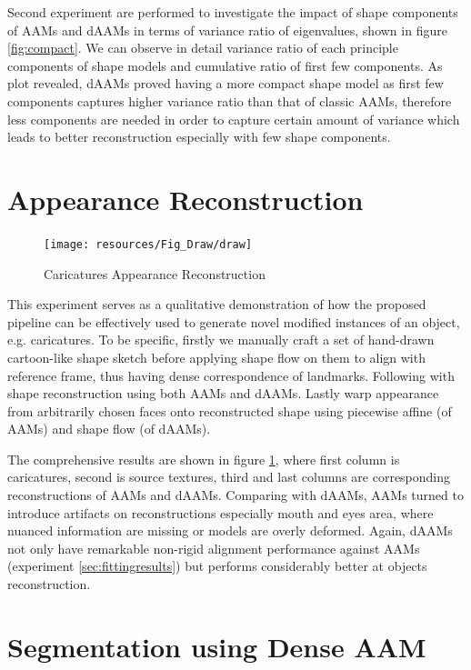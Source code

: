 Second experiment are performed to investigate the impact of shape components of AAMs and dAAMs in terms of variance ratio of eigenvalues, shown in figure \ref{fig:compact}. We can observe in detail variance ratio of each principle components of shape models and cumulative ratio of first few components. As plot revealed, dAAMs proved having a more compact shape model as first few components captures higher variance ratio than that of classic AAMs, therefore less components are needed in order to capture certain amount of variance which leads to better reconstruction especially with few shape components.


\section{Appearance Reconstruction}
\label{sec:reconstruct}

\begin{figure}[h!]
    \centering
    \texttt{[image: resources/Fig\_Draw/draw]}
    \caption{Caricatures Appearance Reconstruction}
    \label{fig:draw}
\end{figure}

This experiment serves as a qualitative demonstration of how the proposed pipeline can be effectively used to generate novel modified instances of an object, e.g. caricatures. To be specific, firstly we manually craft a set of hand-drawn cartoon-like shape sketch before applying shape flow on them to align with reference frame, thus having dense correspondence of landmarks. Following with shape reconstruction using both AAMs and dAAMs. Lastly warp appearance from arbitrarily chosen faces onto reconstructed shape using piecewise affine (of AAMs) and shape flow (of dAAMs). 

The comprehensive results are shown in figure \ref{fig:draw}, where first column is caricatures, second is source textures, third and last columns are corresponding reconstructions of AAMs and dAAMs. Comparing with dAAMs, AAMs turned to introduce artifacts on reconstructions especially mouth and eyes area, where nuanced information are missing or models are overly deformed. Again, dAAMs not only have remarkable non-rigid alignment performance against AAMs (experiment \ref{sec:fittingresults}) but performs considerably better at objects reconstruction.

\section{Segmentation using Dense AAM}
\label{sec:segmentation}

